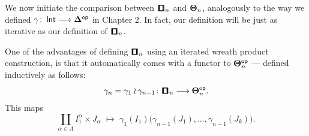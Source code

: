 \noindent We now initiate the comparison between $\cube_n$ and $\mathbf\Theta_n$, analogously to the way we defined $\gamma\colon \operatorname{\mathsf{Int}} \longrightarrow \mathbf\Delta^{\mathsf{op}}$ in Chapter 2. In fact, our definition will be just as iterative as our definition of $\cube_n$.

One of the advantages of defining $\cube_n$ using an iterated wreath product construction, is that it automatically comes with a functor to $\mathbf\Theta_{n}^{\mathsf{op}}$ — defined inductively as follows:
    \begin{equation}
        \gamma_n = \gamma_{1}\wr \gamma_{n-1} \maps \cube_n \longra \bTheta_n^{\op}.
    \end{equation}
This maps 
    \begin{equation}
        \coprod_{\alpha \in A} I_1^{\alpha}\times J_{\alpha} \,\,\longmapsto \,\,\gamma_1(I_1)\big(\gamma_{n-1}(J_1),\ldots, \gamma_{n-1}(J_k)\big).
    \end{equation}

